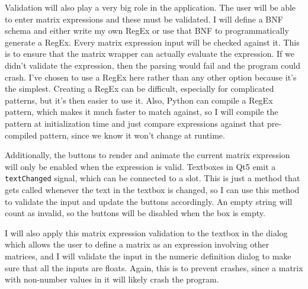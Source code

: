 \documentclass[../main.tex]{subfiles}
\begin{document}
Validation will also play a very big role in the application. The user will be able to enter matrix expressions and these must be validated. I will define a BNF schema and either write my own RegEx or use that BNF to programmatically generate a RegEx. Every matrix expression input will be checked against it. This is to ensure that the matrix wrapper can actually evaluate the expression. If we didn't validate the expression, then the parsing would fail and the program could crash. I've chosen to use a RegEx here rather than any other option because it's the simplest. Creating a RegEx can be difficult, especially for complicated patterns, but it's then easier to use it. Also, Python can compile a RegEx pattern, which makes it much faster to match against, so I will compile the pattern at initialization time and just compare expressions against that pre-compiled pattern, since we know it won't change at runtime.

Additionally, the buttons to render and animate the current matrix expression will only be enabled when the expression is valid. Textboxes in Qt5 emit a \texttt{textChanged} signal, which can be connected to a slot. This is just a method that gets called whenever the text in the textbox is changed, so I can use this method to validate the input and update the buttons accordingly. An empty string will count as invalid, so the buttons will be disabled when the box is empty.

I will also apply this matrix expression validation to the textbox in the dialog which allows the user to define a matrix as an expression involving other matrices, and I will validate the input in the numeric definition dialog to make sure that all the inputs are floats. Again, this is to prevent crashes, since a matrix with non-number values in it will likely crash the program.
\end{document}
